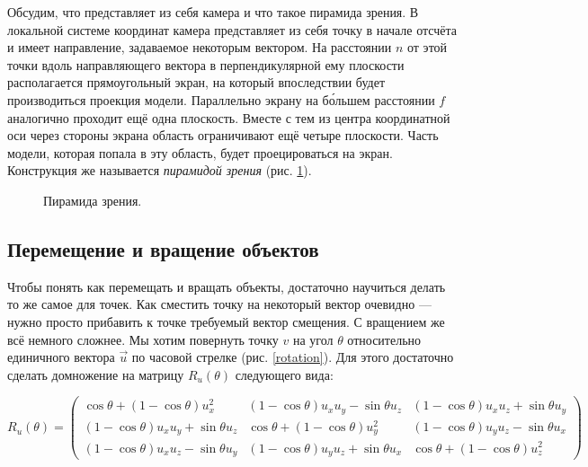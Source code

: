 \documentclass{article}
\begin{document}
Обсудим, что представляет из себя камера и что такое пирамида зрения.
В локальной системе координат камера представляет из себя точку в начале отсчёта и имеет направление, задаваемое некоторым вектором.
На расстоянии $n$ от этой точки вдоль направляющего вектора в перпендикулярной ему плоскости располагается прямоугольный экран, на который впоследствии будет производиться проекция модели.
Параллельно экрану на б\'{о}льшем расстоянии $f$ аналогично проходит ещё одна плоскость.
Вместе с тем из центра координатной оси через стороны экрана область ограничивают ещё четыре плоскости.
Часть модели, которая попала в эту область, будет проецироваться на экран.
Конструкция же называется \emph{пирамидой зрения} (рис. \ref{view frustum}).

\begin{figure}[ht]
    \caption{Пирамида зрения.}
    \label{view frustum}
\end{figure}

\subsection{Перемещение и вращение объектов}

Чтобы понять как перемещать и вращать объекты, достаточно научиться делать то же самое для точек.
Как сместить точку на некоторый вектор очевидно --- нужно просто прибавить к точке требуемый вектор смещения.
С вращением же всё немного сложнее.
Мы хотим повернуть точку $v$ на угол $\theta$ относительно единичного вектора $\vec{u}$ по часовой стрелке (рис. \ref{rotation}).
Для этого достаточно сделать домножение на матрицу $R_{u}(\theta)$ следующего вида:

\begin{equation*}
	R_{u}(\theta) =
		\begin{pmatrix}
			\cos{\theta} + (1 - \cos{\theta})u_{x}^{2} & (1 - \cos{\theta})u_{x}u_{y} - \sin{\theta} u_{z} & (1 - \cos{\theta})u_{x}u_{z} + \sin{\theta} u_{y} \\
			(1 - \cos{\theta})u_{x}u_{y} + \sin{\theta} u_{z} & \cos{\theta} + (1 - \cos{\theta})u_{y}^{2} & (1 - \cos{\theta})u_{y}u_{z} - \sin{\theta} u_{x} \\
			(1 - \cos{\theta})u_{x}u_{z} - \sin{\theta} u_{y} & (1 - \cos{\theta})u_{y}u_{z} + \sin{\theta} u_{x} & \cos{\theta} + (1 - \cos{\theta})u_{z}^{2}
		\end{pmatrix}
\end{equation*}
\end{document}
